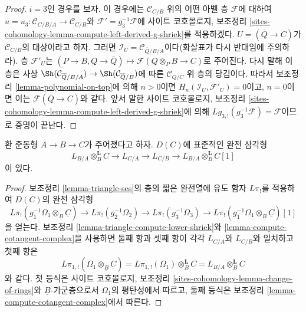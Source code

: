 \begin{proof}
\medskip\noindent
$i=3$인 경우를 보자. 이 경우에는 $\mathcal{C}_{C/B}$ 위의 어떤 아벨 층
$\mathcal{F}$에 대하여 $u=u_3:\mathcal{C}_{C/B/A}\to\mathcal{C}_{C/B}$와
$\mathcal{F}'=g_3^{-1}\mathcal{F}$에 사이트 코호몰로지, 보조정리
\ref{sites-cohomology-lemma-compute-left-derived-g-shriek}를 적용하겠다.
$U=(\overline{Q}\to C)$가 $\mathcal{C}_{C/B}$의 대상이라고 하자. 그러면
$\mathcal{I}_U=\mathcal{C}_{\overline{Q}/B/A}$이다(화살표가 다시 반대임에
주의하라). 층 $\mathcal{F}'_U$는
$(P\to B,Q\to\overline{Q})\mapsto
\mathcal{F}(Q\otimes_PB\to C)$로 주어진다. 다시 말해 이 층은 사상
$\Sh(\mathcal{C}_{\overline{Q}/B/A})\to
\Sh(\mathcal{C}_{\overline{Q}/B})$에 따른
$\mathcal{C}_{\overline{Q}/C}$ 위 층의 당김이다. 따라서 보조정리
\ref{lemma-polynomial-on-top}에 의해 $n>0$이면
$H_n(\mathcal{I}_U,\mathcal{F}'_U)=0$이고, $n=0$이면 이는
$\mathcal{F}(\overline{Q}\to C)$와 같다. 앞서 말한 사이트 코호몰로지,
보조정리 \ref{sites-cohomology-lemma-compute-left-derived-g-shriek}에 의해
$Lg_{3,!}(g_3^{-1}\mathcal{F})=\mathcal{F}$이므로 증명이 끝난다.
\end{proof}

\begin{proposition}
\label{proposition-triangle}
환 준동형 $A\to B\to C$가 주어졌다고 하자. $D(C)$에 표준적인 완전
삼각형
$$
L_{B/A} \otimes_B^\mathbf{L} C \to L_{C/A} \to L_{C/B} \to
L_{B/A} \otimes_B^\mathbf{L} C[1]
$$
이 있다.
\end{proposition}

\begin{proof}
보조정리 \ref{lemma-triangle-ses}의 층의 짧은 완전열에 유도 함자
$L\pi_!$를 적용하여 $D(C)$의 완전 삼각형
$$
L\pi_!(g_1^{-1}\Omega_1 \otimes_{\underline{B}} \underline{C}) \to
L\pi_!(g_2^{-1}\Omega_2) \to
L\pi_!(g_3^{-1}\Omega_3) \to
L\pi_!(g_1^{-1}\Omega_1 \otimes_{\underline{B}} \underline{C})[1]
$$
을 얻는다. 보조정리 \ref{lemma-triangle-compute-lower-shriek}와
\ref{lemma-compute-cotangent-complex}을 사용하면 둘째 항과 셋째 항이
각각 $L_{C/A}$와 $L_{C/B}$와 일치하고 첫째 항은
$$
L\pi_{1, !}(\Omega_1 \otimes_{\underline{B}} \underline{C}) =
L\pi_{1, !}(\Omega_1) \otimes_B^\mathbf{L} C =
L_{B/A} \otimes_B^\mathbf{L} C
$$
와 같다. 첫 등식은 사이트 코호몰로지, 보조정리
\ref{sites-cohomology-lemma-change-of-rings}와 $\underline{B}$-가군층으로서
$\Omega_1$의 평탄성에서 따르고, 둘째 등식은 보조정리
\ref{lemma-compute-cotangent-complex}에서 따른다.
\end{proof}

